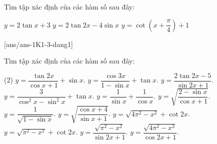 \begin{vd}
	Tìm tập xác định của các hàm số sau đây:
	\begin{tasks}
		\task $y=2\tan x+3$ 
		\task $y=2\tan 2x-4\sin x$ 
		\task $y=\cot \left(x+\dfrac{\pi}{4} \right)+1$ 
	\end{tasks}
\end{vd}
\baitaptl
{}[ans/ans-1K1-3-dang1]
\begin{bt}%
Tìm tập xác định của các hàm số sau đây:
\begin{tasks}(2)
	\task $y=\dfrac{\tan 2x}{\cos x+1}+\sin x$.
	\task $y=\dfrac{\cos 3x}{1-\sin x}+\tan x$.
	\task $y=\dfrac{2\tan 2x-5}{\sin 2x+1}$.
	\task $y=\dfrac{3}{\cos^2 x-\sin^2 x}+\tan x$.
	\task $y=\dfrac{1}{\sin x}+\dfrac{1}{\cos x}$.
	\task $y=\sqrt{\dfrac{2-\sin x}{\cos x+1}}$.
	\task $y=\dfrac{1}{\sqrt{1-\sin x}}$.
	\task $y=\sqrt{\dfrac{\cos x+4}{\sin x+1}}$.
	\task $y=\sqrt{4\pi^2-x^2} + \cot 2x$.
	\task $y=\sqrt{\pi^2-x^2}+\cot 2x$.
	\task $y=\dfrac{\sqrt{\pi^2-x^2}}{\sin 2x+1}$.
	\task $y=\dfrac{\sqrt{4\pi^2-x^2}}{\cos 2x+1}$.
\end{tasks}
\end{bt}
